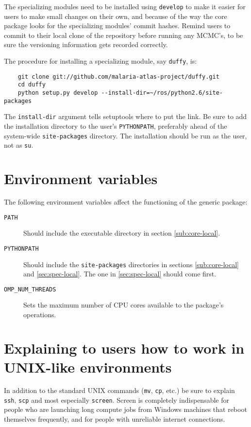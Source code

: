 The specializing modules need to be installed using \texttt{develop} to make it easier for users to make small changes on their own, and because of the way the core package looks for the specializing modules' commit hashes. Remind users to commit to their local clone of the repository before running any MCMC's, to be sure the versioning information gets recorded correctly.

The procedure for installing a specializing module, say \texttt{duffy}, is:
\begin{verbatim}
    git clone git://github.com/malaria-atlas-project/duffy.git
    cd duffy
    python setup.py develop --install-dir=~/ros/python2.6/site-packages
\end{verbatim}
The \texttt{install-dir} argument tells setuptools where to put the link. Be sure to add the installation directory to the user's \texttt{PYTHONPATH}, preferably ahead of the system-wide \texttt{site-packages} directory. The installation should be run as the user, not as \texttt{su}.

\section{Environment variables}
The following environment variables affect the functioning of the generic package:
\begin{description}
    \item[\texttt{PATH}] Should include the executable directory in section \ref{sub:core-local}.
    \item[\texttt{PYTHONPATH}] Should include the \texttt{site-packages} directories in sections \ref{sub:core-local} and \ref{sec:spec-local}. The one in \ref{sec:spec-local} should come first.
    \item[\texttt{OMP\_NUM\_THREADS}] Sets the maximum number of CPU cores available to the package's operations. 
\end{description}

\section{Explaining to users how to work in UNIX-like environments}

In addition to the standard UNIX commands (\texttt{mv}, \texttt{cp}, etc.) be sure to explain \texttt{ssh}, \texttt{scp} and most especially \texttt{screen}. Screen is completely indispensable for people who are launching long compute jobs from Windows machines that reboot themselves frequently, and for people with unreliable internet connections.

